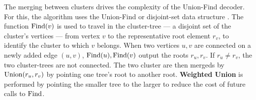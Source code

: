 The merging between clusters drives the complexity of the Union-Find decoder. For this, the algorithm uses the Union-Find or disjoint-set data structure \cite{tarjan1975efficiency}. The function $\operatorname{Find}(v)$ is used to travel in the cluster-tree --- a disjoint set of the cluster's vertices --- from vertex $v$ to the representative root element $r_v$, to identify the cluster to which $v$ belongs. When two vertices $u, v$ are connected on a newly added edge $(u,v)$, $\operatorname{Find}(u), \operatorname{Find}(v)$ output the roots $r_u, r_v$. If $r_u \neq r_v$, the two cluster-trees are not connected. The two cluster are then mergeds by $\operatorname{Union}(r_u, r_v)$ by pointing one tree's root to another root. \textbf{Weighted Union} is performed by pointing the smaller tree to the larger to reduce the cost of future calls to $\operatorname{Find}$.